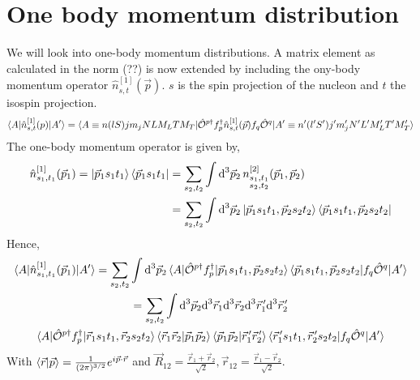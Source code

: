 \documentclass[10pt]{article}
\begin{document}
\section{One body momentum distribution}
We will look into one-body momentum distributions. A matrix element as calculated in the norm (??) is now extended by including the ony-body momentum operator $\hat{n}_{s,t}^{[1]}(\vec{p})$. $s$ is the spin projection of the nucleon and $t$ the isospin projection.
\begin{align*}
	\braket{A | \hat{n}_{s,t}^{[1]}(p) | A'} = \braket { A \equiv n (l S) j m_j N L M_L T M_T | \hat{\mathcal{O}}^{p\dagger} f_{p}^{\dagger} \hat{n}_{s,t}^{[1]}(\vec{p}) f_{q} \hat{ \mathcal{O}}^{q} | A' \equiv n' (l' S') j' m_j' N' L' M_L' T' M_T' }
\end{align*}
The one-body momentum operator is given by,
\begin{align*}
	\hat{n}_{s_1,t_1}^{[1]}(\vec{p}_1) = \ket{\vec{p}_1 s_1 t_1} \bra{\vec{p}_1 s_1 t_1} &= \sum_{s_2,t_2} \int \text{d}^{3} \vec{p}_{2} \, n_{ \substack{ s_1,t_1 \\ s_2,t_2} }^{[2]}(\vec{p}_1,\vec{p}_2)\\
	& = \sum_{s_2,t_2} \int \text{d}^{3} \vec{p}_{2} \ket{ \vec{p}_1 s_1 t_1, \vec{p}_2 s_2 t_2 } \bra { \vec{p}_1 s_1 t_1, \vec{p}_2 s_2 t_2}
\end{align*}
Hence,
\begin{multline*}
	\braket{ A | \hat{n}_{s_1,t_1}^{[1]}(\vec{p}_1) | A'} = \sum_{s_2,t_2} \int \text{d}^{3} \vec{p}_{2} \braket{ A | \hat{\mathcal{O}}^{p\dagger} f_{p}^{\dagger} | \vec{p}_1 s_1 t_1, \vec{p}_2 s_2 t_2 } \braket{ \vec{p}_1 s_1 t_1, \vec{p}_2 s_2 t_2 | f_{q} \hat{ \mathcal{O}}^{q} | A'} \\
	=  \sum_{s_2,t_2} \int \text{d}^{3} \vec{p}_{2} \text{d}^{3} \vec{r}_{1} \text{d}^{3} \vec{r}_{2} \text{d}^{3} \vec{r}_{1}^{\, \prime} \text{d}^{3} \vec{r}_{2}^{\, \prime} \\
	 \braket{ A | \hat{\mathcal{O}}^{p\dagger} f_{p}^{\dagger} | \vec{r}_{1} s_1 t_1, \vec{r}_{2} s_2 t_2 } \braket{ \vec{r}_1 \vec{r}_2 | \vec{p}_1 \vec{p}_2 } \braket{ \vec{p}_1 \vec{p}_2 | \vec{r}_{1}^{\, \prime} \vec{r}_{2}^{\, \prime} } \braket{ \vec{r}_{1}^{\, \prime} s_1 t_1 , \vec{r}_{2}^{\, \prime} s_2 t_2 | f_{q} \hat{ \mathcal{O}}^{q} | A'}
\end{multline*}
With $\braket{ \vec{r} | \vec{p} } = \frac{1}{(2 \pi)^{3/2}} e^{i \vec{p} \cdot \vec{r}}$ and $ \vec{R}_{12} = \frac{\vec{r}_{1} + \vec{r}_{2}}{\sqrt{2}}, \vec{r}_{12} = \frac{\vec{r}_{1} - \vec{r}_{2}}{\sqrt{2}}$.
\end{document}
